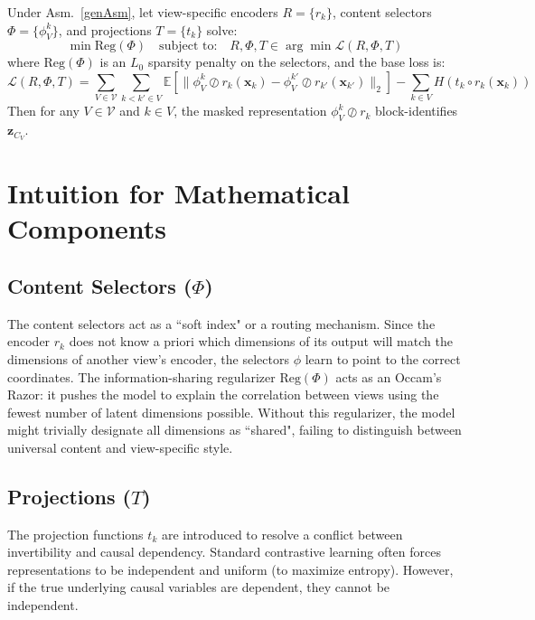 \documentclass[a4paper,12pt]{article}
\begin{document}
\begin{theorem} \label{thm:allContBlocks}
  Under Asm.\ \ref{genAsm}, let view-specific encoders $R = \{r_k\}$, content selectors $\Phi = \{\phi_V^k\}$, and projections $T = \{t_k\}$ solve:
  \begin{equation}
    \min \text{Reg}(\Phi) \quad \text{subject to:} \quad R, \Phi, T \in \arg\min \mathcal{L}(R, \Phi, T)
  \end{equation}
  where $\text{Reg}(\Phi)$ is an $L_0$ sparsity penalty on the selectors, and the base loss is:
  \begin{equation}
    \mathcal{L}(R, \Phi, T) = \sum_{V \in \mathcal{V}} \sum_{k < k' \in V} \mathbb{E} \left[ \|\phi_V^k \oslash r_k(\mathbf{x}_k) - \phi_V^{k'} \oslash r_{k'}(\mathbf{x}_{k'})\|_2 \right] - \sum_{k \in V} H(t_k \circ r_k(\mathbf{x}_k))
  \end{equation}
  Then for any $V \in \mathcal{V}$ and $k \in V$, the masked representation $\phi_V^k \oslash r_k$ block-identifies $\mathbf{z}_{C_V}$.
\end{theorem}

\section{Intuition for Mathematical Components} \label{app:intuition}

\subsection{Content Selectors ($\Phi$)}
The content selectors act as a ``soft index" or a routing mechanism. Since the encoder $r_k$ does not know a priori which dimensions of its output will match the dimensions of another view's encoder, the selectors $\phi$ learn to point to the correct coordinates. The information-sharing regularizer $\text{Reg}(\Phi)$ acts as an Occam's Razor: it pushes the model to explain the correlation between views using the fewest number of latent dimensions possible. Without this regularizer, the model might trivially designate all dimensions as ``shared", failing to distinguish between universal content and view-specific style.

\subsection{Projections ($T$)}
The projection functions $t_k$ are introduced to resolve a conflict between invertibility and causal dependency. Standard contrastive learning often forces representations to be independent and uniform (to maximize entropy). However, if the true underlying causal variables are dependent, they cannot be independent.
\end{document}
